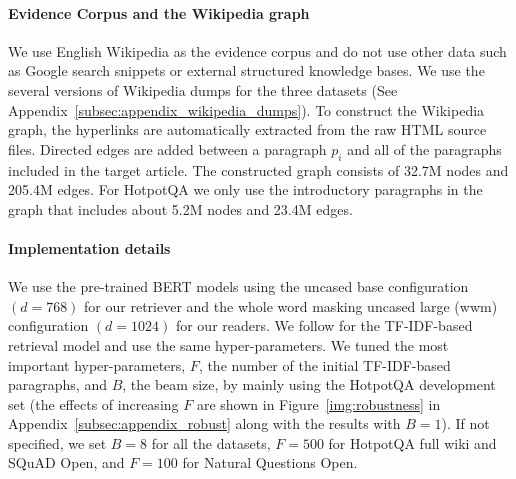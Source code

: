 \vspace{-2mm}\paragraph{Evidence Corpus and the Wikipedia graph}
We use English Wikipedia as the evidence corpus and do not use other data such as Google search snippets or external structured knowledge bases. 
We use the several versions of Wikipedia dumps for the three datasets (See Appendix~\ref{subsec:appendix_wikipedia_dumps}). 
To construct the Wikipedia graph, the hyperlinks are automatically extracted from the raw HTML source files. 
Directed edges are added between a paragraph $p_i$ and all of the paragraphs included in the target article. 
The constructed graph consists of 32.7M nodes and 205.4M edges. 
For HotpotQA we only use the introductory paragraphs in the graph that includes about 5.2M nodes and 23.4M edges. %

\vspace{-2mm}\paragraph{Implementation details}
We use the pre-trained BERT models \citep{devlin2018bert} using the uncased base configuration $(d = 768)$ for our retriever and the whole word masking uncased large (wwm) configuration $(d = 1024)$ for our readers.
We follow \cite{chen2017reading} for the TF-IDF-based retrieval model and use the same hyper-parameters.
We tuned the most important hyper-parameters, $F$, the number of the initial TF-IDF-based paragraphs, and $B$, the beam size, by mainly using the HotpotQA development set (the effects of increasing $F$ are shown in Figure~\ref{img:robustness} in Appendix~\ref{subsec:appendix_robust} along with the results with $B=1$).
If not specified, we set $B=8$ for all the datasets, $F=500$ for HotpotQA full wiki and SQuAD Open, and $F=100$ for Natural Questions Open.

